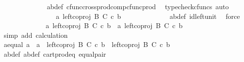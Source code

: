 \begin{isabellebody}
\ \ \ \ \ \ \ \ \ \ \ \ \isamarkupfalse%
\ a{\isacharprime}{\kern0pt}b{\isacharprime}{\kern0pt}{\isacharunderscore}{\kern0pt}def\ cfunc{\isacharunderscore}{\kern0pt}cross{\isacharunderscore}{\kern0pt}prod{\isacharunderscore}{\kern0pt}comp{\isacharunderscore}{\kern0pt}cfunc{\isacharunderscore}{\kern0pt}prod\ \isamarkupfalse%
\ {\isacharparenleft}{\kern0pt}typecheck{\isacharunderscore}{\kern0pt}cfuncs{\isacharcomma}{\kern0pt}\ auto{\isacharparenright}{\kern0pt}\isanewline
\ \ \ \ \ \ \ \ \ \ \isamarkupfalse%
\ \isamarkupfalse%
\ {\isachardoublequoteopen}{\isachardot}{\kern0pt}{\isachardot}{\kern0pt}{\isachardot}{\kern0pt}\ {\isacharequal}{\kern0pt}\ \ {\isasymlangle}a{\isacharprime}{\kern0pt}{\isacharcomma}{\kern0pt}\ left{\isacharunderscore}{\kern0pt}coproj\ B\ C\ {\isasymcirc}\isactrlsub c\ b{\isacharprime}{\kern0pt}{\isasymrangle}{\isachardoublequoteclose}\isanewline
\ \ \ \ \ \ \ \ \ \ \ \ \isamarkupfalse%
\ a{\isacharprime}{\kern0pt}b{\isacharprime}{\kern0pt}{\isacharunderscore}{\kern0pt}def\ id{\isacharunderscore}{\kern0pt}left{\isacharunderscore}{\kern0pt}unit{}\ \isamarkupfalse%
\ force\isanewline
\ \ \ \ \ \ \ \ \ \ \isamarkupfalse%
\ \isamarkupfalse%
\ {\isachardoublequoteopen}{\isasymlangle}a{\isacharcomma}{\kern0pt}\ left{\isacharunderscore}{\kern0pt}coproj\ B\ C\ {\isasymcirc}\isactrlsub c\ b{\isasymrangle}\ {\isacharequal}{\kern0pt}\ {\isasymlangle}a{\isacharprime}{\kern0pt}{\isacharcomma}{\kern0pt}\ left{\isacharunderscore}{\kern0pt}coproj\ B\ C\ {\isasymcirc}\isactrlsub c\ b{\isacharprime}{\kern0pt}{\isasymrangle}{\isachardoublequoteclose}\isanewline
\ \ \ \ \ \ \ \ \ \ \ \ \isamarkupfalse%
\ {\isacharparenleft}{\kern0pt}simp\ add{\isacharcolon}{\kern0pt}\ calculation{\isacharparenright}{\kern0pt}\isanewline
\ \ \ \ \ \ \ \ \isamarkupfalse%
\isanewline
\ \ \ \ \ \ \ \ \isamarkupfalse%
\ \isamarkupfalse%
\ a{\isacharunderscore}{\kern0pt}equal{\isacharcolon}{\kern0pt}\ {\isachardoublequoteopen}a\ {\isacharequal}{\kern0pt}\ a{\isacharprime}{\kern0pt}\ {\isasymand}\ left{\isacharunderscore}{\kern0pt}coproj\ B\ C\ {\isasymcirc}\isactrlsub c\ b\ {\isacharequal}{\kern0pt}\ left{\isacharunderscore}{\kern0pt}coproj\ B\ C\ {\isasymcirc}\isactrlsub c\ b{\isacharprime}{\kern0pt}{\isachardoublequoteclose}\isanewline
\ \ \ \ \ \ \ \ \ \ \isamarkupfalse%
\ a{\isacharprime}{\kern0pt}b{\isacharprime}{\kern0pt}{\isacharunderscore}{\kern0pt}def\ ab{\isacharunderscore}{\kern0pt}def\ cart{\isacharunderscore}{\kern0pt}prod{\isacharunderscore}{\kern0pt}eq{}\ equal{\isacharunderscore}{\kern0pt}pair\ \isamarkupfalse%

\end{isabellebody}
